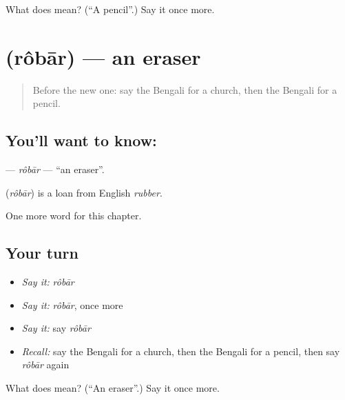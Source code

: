 \begin{tcolorbox}[breakable,colback=teal!4,colframe=teal!35!black,title={Before you move on}]
What does  mean? (\textquotedblleft{}A pencil\textquotedblright{}.) Say it once more.
\end{tcolorbox}
\section[\texorpdfstring{\bn{রবার} (rôbār)}{রবার (rôbār)}]{ (rôbār) — an eraser}

\label{lesson:BN-C129-robar}



\begin{quote}
Before the new one: say the Bengali for a church, then the Bengali for a pencil.
\end{quote}

\subsection*{You'll want to know: }
\textbf{} — \emph{rôbār} — \textquotedblleft{}an eraser\textquotedblright{}.

\begin{cousinweb}
\textbf{} (\emph{rôbār}) is a loan from English \emph{rubber}.
\end{cousinweb}

\begin{grammarlens}[title={What you've built}]
One more word for this chapter.
\end{grammarlens}

\subsection*{Your turn}
\begin{itemize}
\raggedright
  \item \emph{Say it:} \emph{rôbār}
  \item \emph{Say it:} \emph{rôbār}, once more
  \item \emph{Say it:} say \emph{rôbār}
  \item \emph{Recall:} say the Bengali for a church, then the Bengali for a pencil, then say \emph{rôbār} again
\end{itemize}

\begin{tcolorbox}[breakable,colback=teal!4,colframe=teal!35!black,title={Before you move on}]
What does  mean? (\textquotedblleft{}An eraser\textquotedblright{}.) Say it once more.
\end{tcolorbox}
